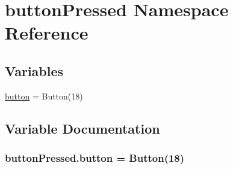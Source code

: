 \hypertarget{namespacebuttonPressed}{}\section{button\+Pressed Namespace Reference}
\label{namespacebuttonPressed}
\subsection*{Variables}
\begin{DoxyCompactItemize}
\item 
\hyperlink{namespacebuttonPressed_aeba278c65245caff9944ba0e28e98b65}{button} = Button(18)
\end{DoxyCompactItemize}


\subsection{Variable Documentation}
\subsubsection[{\texorpdfstring{button}{button}}]{\setlength{\rightskip}{0pt plus 5cm}button\+Pressed.\+button = Button(18)}\hypertarget{namespacebuttonPressed_aeba278c65245caff9944ba0e28e98b65}{}\label{namespacebuttonPressed_aeba278c65245caff9944ba0e28e98b65}
